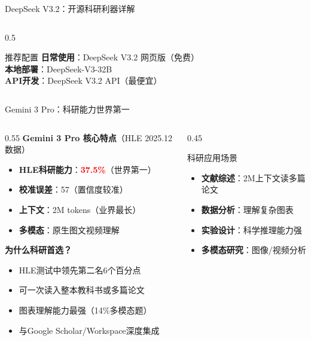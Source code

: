 \documentclass[aspectratio=169,11pt]{beamer}
\begin{document}
\begin{frame}{DeepSeek V3.2：开源科研利器详解}
\begin{columns}
\begin{column}{0.5\textwidth}
            \vspace{0.3cm}
            \begin{exampleblock}{推荐配置}
                \textbf{日常使用}：DeepSeek V3.2 网页版（免费）\\
                \textbf{本地部署}：DeepSeek-V3-32B\\
                \textbf{API开发}：DeepSeek V3.2 API（最便宜）
            \end{exampleblock}
        \end{column}
    \end{columns}
\end{frame}

\begin{frame}{Gemini 3 Pro：科研能力世界第一}
    \begin{columns}
        \begin{column}{0.55\textwidth}
            \textbf{Gemini 3 Pro 核心特点}（HLE 2025.12数据）
            \begin{itemize}
                \item \textbf{HLE科研能力}：\textcolor{red}{\textbf{37.5\%}}（世界第一）
                \item \textbf{校准误差}：57（置信度较准）
                \item \textbf{上下文}：2M tokens（业界最长）
                \item \textbf{多模态}：原生图文视频理解
            \end{itemize}
            
            \vspace{0.2cm}
            \textbf{为什么科研首选？}
            \begin{itemize}
                \item HLE测试中领先第二名6个百分点
                \item 可一次读入整本教科书或多篇论文
                \item 图表理解能力最强（14\%多模态题）
                \item 与Google Scholar/Workspace深度集成
            \end{itemize}
        \end{column}
        \begin{column}{0.45\textwidth}
            \begin{block}{科研应用场景}
                \begin{itemize}
                    \item \textbf{文献综述}：2M上下文读多篇论文
                    \item \textbf{数据分析}：理解复杂图表
                    \item \textbf{实验设计}：科学推理能力强
                    \item \textbf{多模态研究}：图像/视频分析
                \end{itemize}
            \end{block}
            

\end{column}
\end{columns}
\end{frame}
\end{document}

